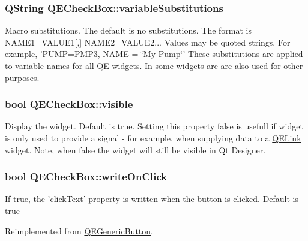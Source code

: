 \hypertarget{classQECheckBox_add28ca3eec333796a42c3f4945c3ce91}{
\subsubsection[{variableSubstitutions}]{\setlength{\rightskip}{0pt plus 5cm}QString QECheckBox::variableSubstitutions}}
\label{classQECheckBox_add28ca3eec333796a42c3f4945c3ce91}
Macro substitutions. The default is no substitutions. The format is NAME1=VALUE1\mbox{[},\mbox{]} NAME2=VALUE2... Values may be quoted strings. For example, 'PUMP=PMP3, NAME = \char`\"{}My Pump\char`\"{}' These substitutions are applied to variable names for all QE widgets. In some widgets are are also used for other purposes. \hypertarget{classQECheckBox_aece8c8fd61778af026592bae796dd8e7}{
\subsubsection[{visible}]{\setlength{\rightskip}{0pt plus 5cm}bool QECheckBox::visible}}
\label{classQECheckBox_aece8c8fd61778af026592bae796dd8e7}
Display the widget. Default is true. Setting this property false is usefull if widget is only used to provide a signal -\/ for example, when supplying data to a \hyperlink{classQELink}{QELink} widget. Note, when false the widget will still be visible in Qt Designer. \hypertarget{classQECheckBox_af0b9c9339a5525ae5e4d2057e7bbd073}{
\subsubsection[{writeOnClick}]{\setlength{\rightskip}{0pt plus 5cm}bool QECheckBox::writeOnClick}}
\label{classQECheckBox_af0b9c9339a5525ae5e4d2057e7bbd073}
If true, the 'clickText' property is written when the button is clicked. Default is true 

Reimplemented from \hyperlink{classQEGenericButton}{QEGenericButton}.

